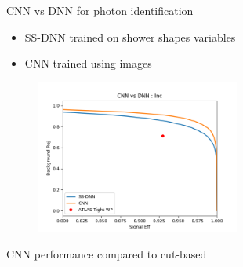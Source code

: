 \begin{frame}{CNN vs DNN for photon identification}
\begin{itemize}
    \item SS-DNN trained on shower shapes variables
    \item CNN trained using images 
\end{itemize}
\begin{figure}
    \centering
    \includegraphics[width=0.6\textwidth]{BackUp/Part6/Img/CNN_vs_DNN.png}
\end{figure}
\end{frame}

\begin{frame}{CNN performance compared to cut-based}
    \begin{figure}
        \centering
    \end{figure}
\end{frame}

